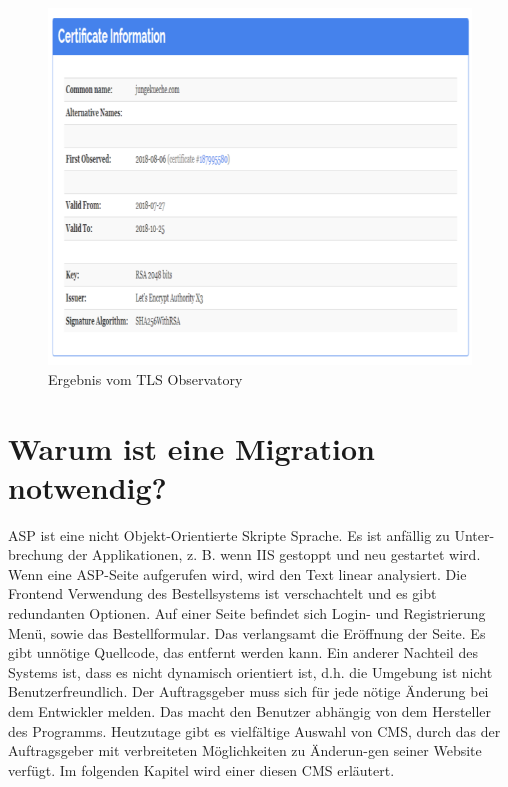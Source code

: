 \begin{figure}[h]
	\centering
	\includegraphics[width=0.8\linewidth]{Graphics/obser2.png}
	\caption[Egebniss TSL Observatory]{Ergebnis vom TLS Observatory}
	\label{fig: TSL Observatory: Ergebnis}
\end{figure}

\section{Warum ist eine Migration notwendig?}

ASP ist eine nicht Objekt-Orientierte Skripte Sprache. Es ist anfällig zu Unter-brechung der Applikationen, z. B. wenn \ac{IIS} gestoppt und neu gestartet wird. Wenn eine ASP-Seite aufgerufen wird, wird den Text linear analysiert.
Die Frontend Verwendung des Bestellsystems ist verschachtelt und es gibt redundanten Optionen. Auf einer Seite befindet sich Login- und Registrierung Menü, sowie das Bestellformular. Das verlangsamt die Eröffnung der Seite. 
Es gibt unnötige Quellcode, das entfernt werden kann. Ein anderer Nachteil des Systems ist, dass es nicht dynamisch orientiert ist, d.h. die Umgebung ist nicht Benutzerfreundlich. Der Auftragsgeber muss sich für jede nötige Änderung bei dem Entwickler melden. Das macht den Benutzer abhängig von dem Hersteller des Programms.
Heutzutage gibt es vielfältige Auswahl von CMS, durch das der Auftragsgeber mit verbreiteten Möglichkeiten zu Änderun-gen seiner Website verfügt. 
Im folgenden Kapitel wird einer diesen CMS erläutert.




